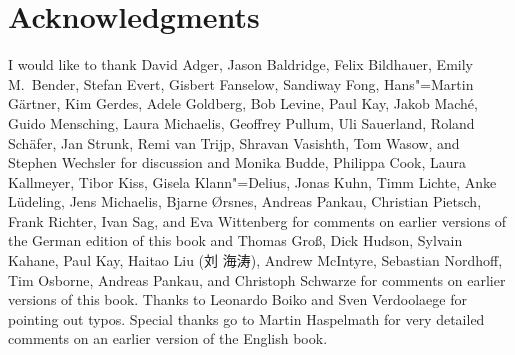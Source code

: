 \section*{Acknowledgments}


I would like to thank David Adger,
Jason Baldridge, 
Felix Bildhauer, 
Emily M.\ Bender,
Stefan Evert, 
Gisbert Fanselow, 
Sandiway Fong,
Hans"=Martin Gärtner,
Kim Gerdes,
Adele Goldberg,
Bob Levine,
Paul Kay,
Jakob Maché,
Guido Mensching,
Laura Michaelis,
Geoffrey Pullum, 
Uli Sauerland, 
Roland Schäfer,
Jan Strunk,
Remi van Trijp, 
Shravan Vasishth,
Tom Wasow, and
Stephen Wechsler
for discussion and 
%
Monika Budde, 
Philippa Cook,
Laura Kallmeyer, 
Tibor Kiss,
Gisela Klann"=Delius, 
Jonas Kuhn,
Timm Lichte, %
Anke Lüdeling,
Jens Michaelis,
Bjarne Ørsnes,
Andreas Pankau,     %
Christian Pietsch,
Frank Richter,
Ivan Sag, and
Eva Wittenberg
for comments on earlier versions of the German edition of this book and
%
%
Thomas Groß,
Dick Hudson,
Sylvain Kahane, 
Paul Kay,
Haitao Liu (刘 海涛),
Andrew McIntyre,
Sebastian Nordhoff,
Tim Osborne, 
Andreas Pankau, and
Christoph Schwarze
for comments on earlier versions of this book. Thanks to Leonardo Boiko and Sven Verdoolaege for pointing out typos.
Special thanks go to Martin Haspelmath for very detailed comments on an
earlier version of the English book. 


